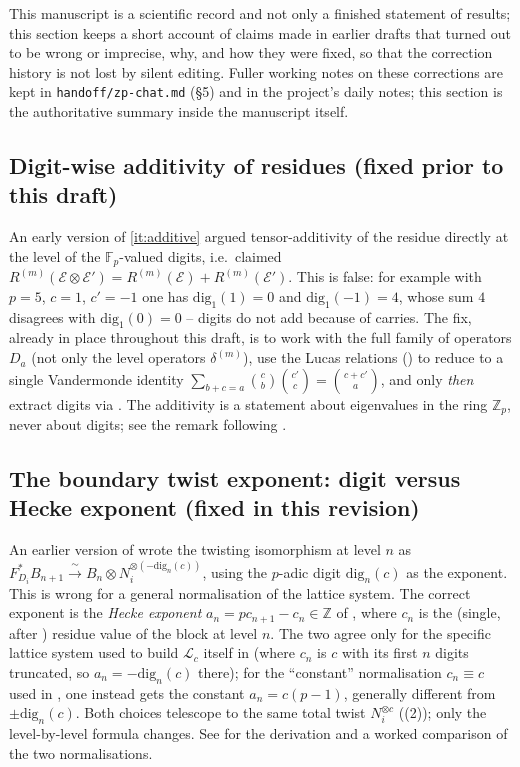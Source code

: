 \documentclass[11pt,reqno]{amsart}
\newcommand{\Zp}{\mathbb{Z}_p}
\newcommand{\Fp}{\mathbb{F}_p}
\newcommand{\ZZ}{\mathbb{Z}}
\newcommand{\cE}{\mathcal{E}}
\newcommand{\cL}{\mathcal{L}}
\newcommand{\dig}{\mathrm{dig}}
\newcommand{\isoto}{\xrightarrow{\ \sim\ }}
\theoremstyle{plain}
\theoremstyle{definition}
\theoremstyle{remark}
\numberwithin{equation}{section}
\begin{document}
This manuscript is a scientific record and not only a finished statement
of results; this section keeps a short account of claims made in earlier
drafts that turned out to be wrong or imprecise, why, and how they were
fixed, so that the correction history is not lost by silent editing.
Fuller working notes on these corrections are kept in
\texttt{handoff/zp-chat.md} (\S5) and in the project's daily notes; this
section is the authoritative summary inside the manuscript itself.

\subsection{Digit-wise additivity of residues (fixed prior to this
draft)}
An early version of \eqref{it:additive} argued
tensor-additivity of the residue directly at the level of the $\Fp$-valued
digits, i.e.\ claimed
$R^{(m)}(\cE\otimes\cE')=R^{(m)}(\cE)+R^{(m)}(\cE')$.  This is false: for
example with $p=5$, $c=1$, $c'=-1$ one has $\dig_1(1)=0$ and
$\dig_1(-1)=4$, whose sum $4$ disagrees with $\dig_1(0)=0$ -- digits do
not add because of carries.  The fix, already in place throughout this
draft, is to work with the full family of operators $D_a$ (not only the
level operators $\delta^{(m)}$), use the Lucas relations
() to reduce to a single Vandermonde identity
$\sum_{b+c=a}\binom cb\binom{c'}{c}=\binom{c+c'}a$, and only \emph{then}
extract digits via .  The additivity is a statement
about eigenvalues in the ring $\Zp$, never about digits; see the
remark following .

\subsection{The boundary twist exponent: digit versus Hecke exponent
(fixed in this revision)}
An earlier version of  wrote the twisting isomorphism
at level $n$ as $F^*_{D_i}B_{n+1}\isoto B_n\otimes N_i^{\otimes(-\dig_n(c))}$,
using the $p$-adic digit $\dig_n(c)$ as the exponent.  This is wrong for
a general normalisation of the lattice system.  The correct exponent is
the \emph{Hecke exponent} $a_n=pc_{n+1}-c_n\in\ZZ$ of
, where $c_n$ is the (single, after
) residue value of the block at level $n$.  The two
agree only for the specific lattice system used to build $\cL_c$ itself
in  (where $c_n$ is $c$ with its first $n$
digits truncated, so $a_n=-\dig_n(c)$ there); for the ``constant''
normalisation $c_n\equiv c$ used in , one instead gets
the constant $a_n=c(p-1)$, generally different from $\pm\dig_n(c)$.  Both
choices telescope to the same total twist $N_i^{\otimes c}$
((2)); only the level-by-level formula changes.  See
 for the derivation and a worked comparison of
the two normalisations.
\end{document}
